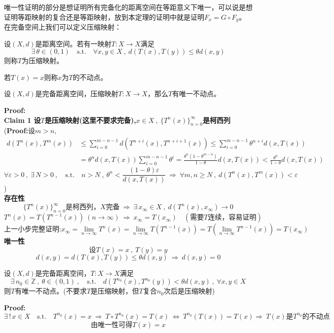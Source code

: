 唯一性证明的部分是想证明所有完备化的距离空间在等距意义下唯一，可以说是想证明等距映射的复合还是等距映射，放到本定理的证明中就是证明$F_x=G \circ F_y$。
\newpage
在完备空间上我们可以定义压缩映射：
\begin{definition}[压缩映射]
    设$(X,d)$是距离空间。若有一映射$T:X \to X$满足
    \[\exists \, \theta \in (0,1) \quad \text{s.t.} \quad \forall x,y \in X \ , \ d(T(x),T(y)) \leq \theta d(x,y)\]
    则称$T$为压缩映射。
\end{definition}
\begin{definition}[不动点]
    若$T(x)=x$则称$x$为$T$的不动点。
\end{definition}
\begin{theorem}[压缩映射原理]
    设$(X,d)$是完备距离空间，压缩映射$T:X \to X$，那么$T$有唯一不动点。
\end{theorem}
\textbf{Proof:}\\
\textbf{Claim 1 设$T$是压缩映射(这里不要求完备),$x \in X \ , \ \{T^n(x)\}_{n=0}^{\infty}$是柯西列}\\
(\textbf{Proof:}设$m>n$,
\begin{equation*}
    \begin{aligned}
        d(T^n(x),T^m(x)) & \leq \sum_{i=0}^{m-n-1}d(T^{n+i}(x),T^{n+i+1}(x)) \leq \sum_{i=0}^{m-n-1}\theta^{n+i}d(x,T(x)) \\
        & =\theta^nd(x,T(x))\sum_{i=0}^{m-n-1}\theta^i=\frac{\theta^n(1-\theta^{m-n})}{1-\theta}d(x,T(x)) < \frac{\theta^n}{1-\theta}d(x,T(x))
    \end{aligned}
\end{equation*}
\[\forall \varepsilon>0 \ , \ \exists \, N>0 \ , \quad \text{s.t.} \quad n>N \ , \ \theta^n<\frac{(1-\theta)\varepsilon}{d(x,T(x))} \ \Rightarrow \ \forall m,n \geq N \ , \ d(T^n(x),T^m(x))<\varepsilon\]
)\\
\textbf{存在性}
\[\{T^n(x)\}_{n=0}^{\infty}\text{是柯西列，}X\text{完备} \ \Rightarrow \ \exists \, x_{\infty} \in X \ , \ d(T^n(x),x_{\infty}) \to 0\]
\[T^n(x)=T\left(T^{n-1}(x)\right) \ (n \to \infty) \ \Rightarrow \ x_{\infty}=T(x_{\infty}) \quad (\text{需要}T\text{连续，容易证明})\]
\[\text{上一小步完整证明:}x_{\infty}=\lim_{n \to \infty}T^n(x)=\lim_{n \to \infty}T(T^{n-1}(x))=T(\lim_{n \to \infty}T^{n-1}(x))=T(x_{\infty})\]
\textbf{唯一性}
\[\text{设}T(x)=x \ , \ T(y)=y\]
\[d(x,y)=d(T(x),T(y)) \leq \theta d(x,y) \ \Rightarrow \ d(x,y)=0\]
\begin{proposition}[推广的压缩映射原理]
    设$(X,d)$是完备距离空间，$T:X \to X$满足
    \[\exists \, n_0 \in \mathbb{Z} \ , \ \theta \in (0,1) \ , \quad \text{s.t.} \quad d(T^{n_0}(x),T^{n_0}(y))<\theta d(x,y) \ , \ \forall x,y \in X\]
    则$T$有唯一不动点。(不要求$T$是压缩映射，但$T$复合$n_0$次后是压缩映射)
\end{proposition}
\textbf{Proof:}
\[\exists \, ! \, x \in X \quad \text{s.t.} \quad T^{n_0}(x)=x \ \Rightarrow \ T \circ T^{n_0}(x)=T(x) \ \Leftrightarrow \ T^{n_0}(T(x))=T(x) \Rightarrow \ T(x)\text{是}T^{n_0}\text{的不动点}\]
\[\text{由唯一性可得}T(x)=x\]

